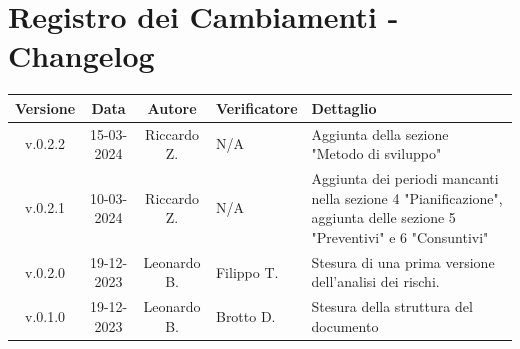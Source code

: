 \documentclass[12pt, oneside]{article}
\begin{document}
\section*{Registro dei Cambiamenti - Changelog}
\begin{tabular}{|c|c|c|p{3cm}|p{6cm}|}
\hline
\textbf{Versione} & \textbf{Data} & \textbf{Autore} & \textbf{Verificatore} & \textbf{Dettaglio} \\
\hline
v.0.2.2 & 15-03-2024 & Riccardo Z. & N/A & Aggiunta della sezione "Metodo di sviluppo" \\
\hline
v.0.2.1 & 10-03-2024 & Riccardo Z. & N/A & Aggiunta dei periodi mancanti nella sezione 4 "Pianificazione", aggiunta delle sezione 5 "Preventivi" e 6 "Consuntivi" \\
\hline
v.0.2.0 & 19-12-2023 & Leonardo B. & Filippo T. & Stesura di una prima versione dell'analisi dei rischi. \\
\hline
v.0.1.0 & 19-12-2023 & Leonardo B. & Brotto D. & Stesura della struttura del documento \\
\hline
\end{tabular}
\newpage


\tableofcontents
\newpage

\newpage

\newpage

\newpage

\newpage

\newpage

\end{document}
